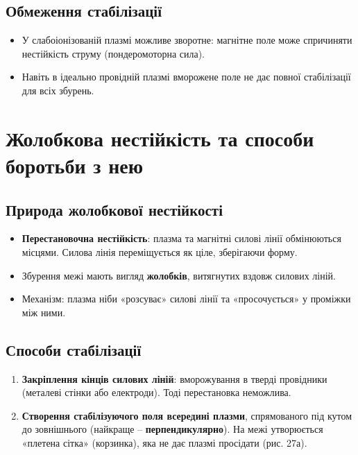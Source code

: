 \documentclass[a4paper,12pt]{article}
\begin{document}
\subsection{Обмеження стабілізації}

\begin{itemize}
    \item У слабоіонізованій плазмі можливе зворотне: магнітне поле може спричиняти нестійкість струму (пондеромоторна сила).
    \item Навіть в ідеально провідній плазмі вморожене поле не дає повної стабілізації для всіх збурень.
\end{itemize}

\section{Жолобкова нестійкість та способи боротьби з нею}

\subsection{Природа жолобкової нестійкості}

\begin{itemize}
    \item \textbf{Перестановочна нестійкість}: плазма та магнітні силові лінії обмінюються місцями. Силова лінія переміщується як ціле, зберігаючи форму.
    \item Збурення межі мають вигляд \textbf{жолобків}, витягнутих вздовж силових ліній.
    \item Механізм: плазма ніби «розсуває» силові лінії та «просочується» у проміжки між ними.
\end{itemize}

\subsection{Способи стабілізації}

\begin{enumerate}
    \item \textbf{Закріплення кінців силових ліній}: вморожування в тверді провідники (металеві стінки або електроди). Тоді перестановка неможлива.
    \item \textbf{Створення стабілізуючого поля всередині плазми}, спрямованого під кутом до зовнішнього (найкраще – \textbf{перпендикулярно}). На межі утворюється «плетена сітка» (корзинка), яка не дає плазмі просідати (рис. 27а).
\end{enumerate}
\end{document}
